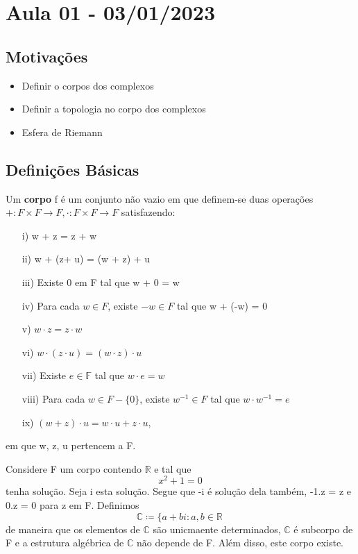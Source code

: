 \documentclass[complex.tex]{subfiles}
\begin{document}
\section{Aula 01 - 03/01/2023}
\subsection{Motivações}
\begin{itemize}
	\item Definir o corpos dos complexos
	\item Definir a topologia no corpo dos complexos
	\item Esfera de Riemann
\end{itemize}

\subsection{Definições Básicas}
\begin{def*}
	Um \textbf{corpo} f é um conjunto não vazio em que definem-se duas operações $+:F\times{F}\rightarrow F, \cdot:F\times{F}\rightarrow F$ satisfazendo:
	\begin{itemize}
		\item[i)] w + z = z + w
		\item[ii)] w + (z+ u) = (w + z) + u
		\item[iii)] Existe 0 em F tal que w + 0 = w
		\item[iv)] Para cada $w\in F$, existe $-w \in F$ tal que w + (-w) = 0
		\item[v)] $w\cdot z = z\cdot w$
		\item[vi)] $w\cdot(z\cdot u) = (w\cdot z)\cdot u$
		\item[vii)] Existe $e\in \mathbb{F}$ tal que $w\cdot{e} = w$
		\item[viii)] Para cada $w\in{F-\{0\}}$, existe $w ^{-1}\in{F}$ tal que $w\cdot w ^{-1} = e$
		\item[ix)] $(w+z)\cdot{u} = w\cdot u + z\cdot u,$
	\end{itemize}
	em que w, z, u pertencem a F.
\end{def*}
Considere F um corpo contendo $\mathbb{R}$ e tal que
$$
	x ^{2} + 1 = 0
$$
tenha solução. Seja i esta solução. Segue que -i é solução dela também, -1.z = z e 0.z = 0 para z em F. Definimos
$$
	\mathbb{C}\coloneqq  \{a + bi: a, b\in \mathbb{R}\,
$$
de maneira que os elementos de $\mathbb{C}$ são unicmaente determinados, $\mathbb{C}$ é subcorpo de F e a estrutura
algébrica de $\mathbb{C}$ não depende de F. Além disso, este corpo existe.
\end{document}
